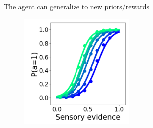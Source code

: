 \documentclass[14pt]{beamer}
\begin{document}
\begin{frame}{The agent can generalize to new priors/rewards}

  \begin{figure}[htb]
  \includegraphics[width=0.5\textwidth]{images/ptask/avg_psycho_g}
  \end{figure}

\end{frame}
\end{document}
